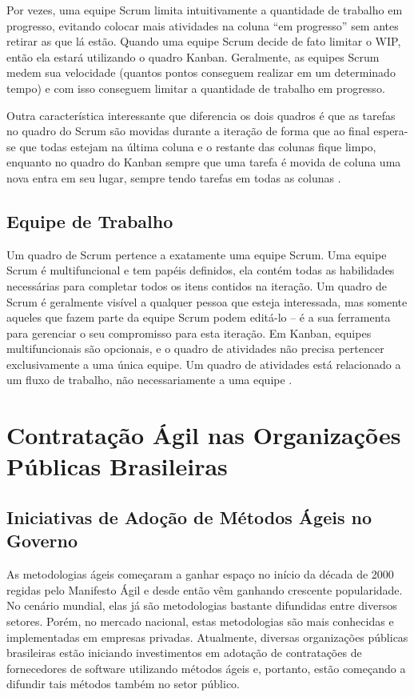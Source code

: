 Por vezes, uma equipe Scrum limita intuitivamente a quantidade de trabalho em progresso, evitando colocar mais atividades na coluna “em progresso” sem antes retirar as que lá estão. Quando uma equipe Scrum decide de fato limitar o WIP, então ela estará utilizando o quadro Kanban. Geralmente, as equipes Scrum medem sua velocidade (quantos pontos conseguem realizar em um determinado tempo) e com isso conseguem limitar a quantidade de trabalho em progresso.

Outra característica interessante que diferencia os dois quadros é que as tarefas no quadro do Scrum são movidas durante a iteração de forma que ao final espera-se que todas estejam na última coluna e o restante das colunas fique limpo, enquanto no quadro do Kanban sempre que uma tarefa é movida de coluna uma nova entra em seu lugar, sempre tendo tarefas em todas as colunas  \cite{kniberg2009}.

\subsection[Equipe de Trabalho]{Equipe de Trabalho}

Um quadro de Scrum pertence a exatamente uma equipe Scrum. Uma equipe Scrum é multifuncional e tem papéis definidos, ela contém todas as habilidades necessárias para completar todos os itens contidos na iteração. Um quadro de Scrum é geralmente visível a qualquer pessoa que esteja interessada, mas somente aqueles que fazem parte da equipe Scrum podem editá-lo – é a sua ferramenta para gerenciar o seu compromisso para esta iteração. Em Kanban, equipes multifuncionais são opcionais, e o quadro de atividades não precisa pertencer exclusivamente a uma única equipe. Um quadro de atividades está relacionado a um fluxo de trabalho, não necessariamente a uma equipe  \cite{kniberg2009}.

\section[Contratação Ágil nas Organizações Públicas Brasileiras]{Contratação Ágil nas Organizações Públicas Brasileiras}

\subsection[Iniciativas de Adoção de Métodos Ágeis no Governo]{Iniciativas de Adoção de Métodos Ágeis no Governo}

As metodologias ágeis começaram a ganhar espaço no início da década de 2000 regidas pelo Manifesto Ágil e desde então vêm ganhando crescente popularidade. No cenário mundial, elas já são metodologias bastante difundidas entre diversos setores. Porém, no mercado nacional, estas metodologias são mais conhecidas e implementadas em empresas privadas. Atualmente, diversas organizações públicas brasileiras estão iniciando investimentos em adotação de contratações de fornecedores de software utilizando métodos ágeis e, portanto, estão começando a difundir tais métodos também no setor público.

